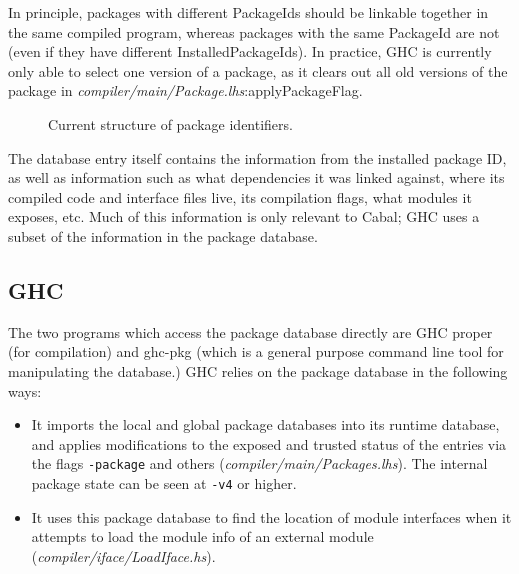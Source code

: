 \documentclass{article}
\newcommand{\ghcfile}[1]{\textsl{#1}}
\begin{document}
In principle, packages with different PackageIds should be linkable
together in the same compiled program, whereas packages with the same
PackageId are not (even if they have different InstalledPackageIds).  In
practice, GHC is currently only able to select one version of a package,
as it clears out all old versions of the package in
\ghcfile{compiler/main/Package.lhs}:applyPackageFlag.

\begin{figure}
\label{fig:current-pkgid}\caption{Current structure of package identifiers.}
\end{figure}

The database entry itself contains the information from the installed package ID,
as well as information such as what dependencies it was linked against, where
its compiled code and interface files live, its compilation flags, what modules
it exposes, etc.  Much of this information is only relevant to Cabal; GHC
uses a subset of the information in the package database.

\subsection{GHC}

The two programs which access the package database directly are GHC
proper (for compilation) and ghc-pkg (which is a general purpose
command line tool for manipulating the database.)  GHC relies on
the package database in the following ways:

\begin{itemize}
    \item It imports the local and global package databases into
        its runtime database, and applies modifications to the exposed
        and trusted status of the entries via the flags \verb|-package|
        and others (\ghcfile{compiler/main/Packages.lhs}).  The internal
        package state can be seen at \verb|-v4| or higher.
    \item It uses this package database to find the location of module
        interfaces when it attempts to load the module info of an external
        module (\ghcfile{compiler/iface/LoadIface.hs}).
\end{itemize}
\end{document}
